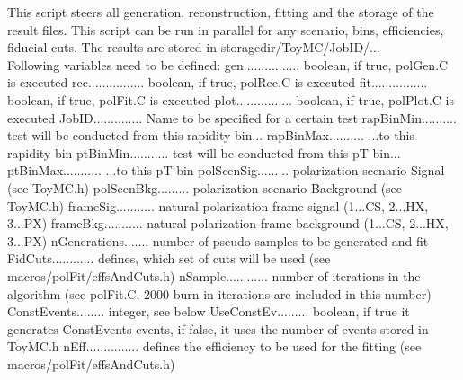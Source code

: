 \documentclass{article}
\begin{document}
This script steers all generation, reconstruction, fitting and the storage of the result
files. This script can be run in parallel for any scenario, bins, efficiencies, fiducial
cuts. The results are stored in storagedir/ToyMC/JobID/...\\
Following variables need to be defined:
\newline gen................ boolean, if true, polGen.C is executed
\newline rec................ boolean, if true, polRec.C is executed
\newline fit................ boolean, if true, polFit.C is executed
\newline plot................ boolean, if true, polPlot.C is executed
\newline JobID.............. Name to be specified for a certain test
\newline rapBinMin.......... test will be conducted from this rapidity bin...
\newline rapBinMax.......... ...to this rapidity bin
\newline ptBinMin........... test will be conducted from this pT bin...
\newline ptBinMax........... ...to this pT bin
\newline polScenSig......... polarization scenario Signal (see ToyMC.h)
\newline polScenBkg......... polarization scenario Background (see ToyMC.h)
\newline frameSig........... natural polarization frame signal (1...CS, 2...HX, 3...PX)
\newline frameBkg........... natural polarization frame background (1...CS, 2...HX, 3...PX)
\newline nGenerations....... number of pseudo samples to be generated and fit
\newline FidCuts............ defines,
which set of cuts will be used (see macros/polFit/effsAndCuts.h)
\newline nSample............ number of iterations in the algorithm (see polFit.C, 2000 burn-in iterations are included in this number)
\newline ConstEvents........ integer, see below
\newline UseConstEv......... boolean, if true it generates ConstEvents events, if false, it uses the number of events
stored in ToyMC.h
\newline nEff............... defines the efficiency to be used for the
fitting (see macros/polFit/effsAndCuts.h)
\end{document}

